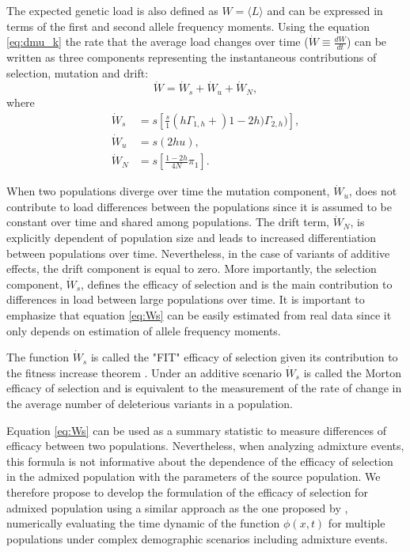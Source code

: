 \documentclass[a4paper, 12pt]{article}
\begin{document}
The expected genetic load is also defined as $W = \langle L \rangle$ and can be
expressed in terms of the first and second allele frequency moments. Using the
equation \eqref{eq:dmu_k} the rate that the average load changes over time
($\dot W \equiv \frac{d W}{dt}$) can be written as three components representing
the instantaneous contributions of selection, mutation and drift: 
\[
	\dot W = \dot W_s + \dot W_u + \dot W_N,
\]
where 
\begin{align}
  \label{eq:Ws}
	\dot W_s &= s \left[ \frac{s}{1}(h\Gamma_{1,h} + )1 - 2h)\Gamma_{2,h})\right], \\
	\dot W_u &= s(2hu), \nonumber\\
	\dot W_N &= s \left[ \frac{1 - 2h}{4N}\pi_1\right].\nonumber
\end{align}

When two populations diverge over time the mutation component, $\dot W_u$, does
not contribute to load differences between the populations since it is assumed
to be constant over time and shared among populations. The drift term, $\dot
W_N$, is explicitly dependent of population size and leads to increased
differentiation  between populations over time.  Nevertheless, in the case of
variants of additive effects, the drift component is equal to zero. More
importantly, the selection component, $\dot W_s$, defines the efficacy of
selection and is the main contribution to differences in load between large
populations over  time.
It is important to emphasize that  equation
\eqref{eq:Ws} can be easily estimated from real data since it only depends on
estimation of allele frequency moments.

The function $\dot W_s$ is called the "FIT" efficacy of selection given its
contribution to  the fitness increase theorem \citep{Gravel2016,Ewens2004}.
Under an additive  scenario  $\dot W_s$ is called the Morton efficacy
of selection and is equivalent to the measurement of the rate of change in the
average number of deleterious variants in a population.  

Equation \eqref{eq:Ws} can be used as a summary statistic to measure
differences of efficacy between two populations.  Nevertheless, when analyzing
admixture events, this formula is not informative about the dependence of the
efficacy of selection in the admixed population with the parameters of the
source population. We therefore propose to develop the formulation of the
efficacy of selection for admixed population using a similar approach as the
one proposed by \cite{Jouganous2017}, numerically evaluating the time dynamic
of the function $\phi(x,t)$ for multiple populations under complex demographic
scenarios including admixture events.  
\end{document}
